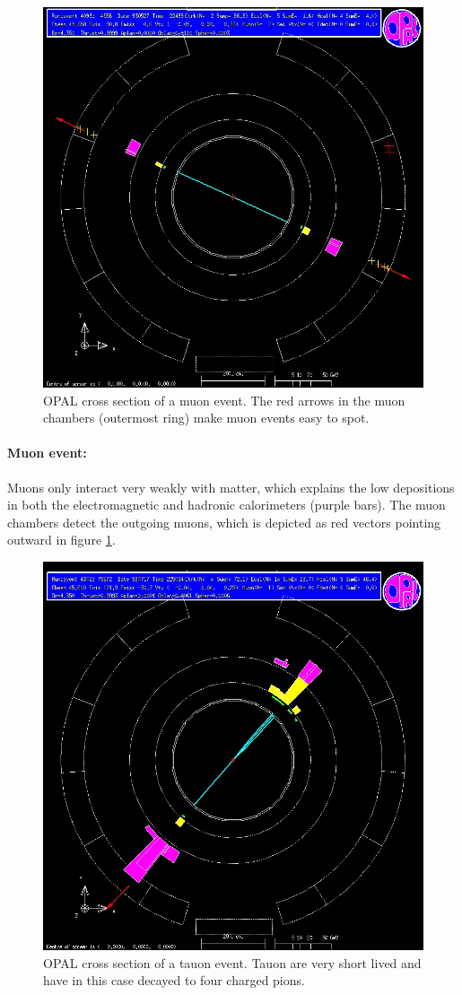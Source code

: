\begin{figure}[H]
\centering
\includegraphics[width=0.75\linewidth]{graphics/muonopal}
\caption[OPAL cross section muon event]{OPAL cross section of a muon event. The red arrows in the muon chambers (outermost ring) make muon events easy to spot.}
\label{fig:muonopal}
\end{figure}
\paragraph{Muon event:} Muons only interact very weakly with matter, which explains the low depositions in both the electromagnetic and hadronic calorimeters (purple bars). The muon chambers detect the outgoing muons, which is depicted as red vectors pointing outward in figure \ref{fig:muonopal}.
\newpage
\begin{figure}[H]
\centering
\includegraphics[width=0.75\linewidth]{graphics/tauonopal}
\caption[OPAL cross section tauon event]{OPAL cross section of a tauon event. Tauon are very short lived and have in this case decayed to four charged pions.}
\label{fig:tauonopal}
\end{figure}
